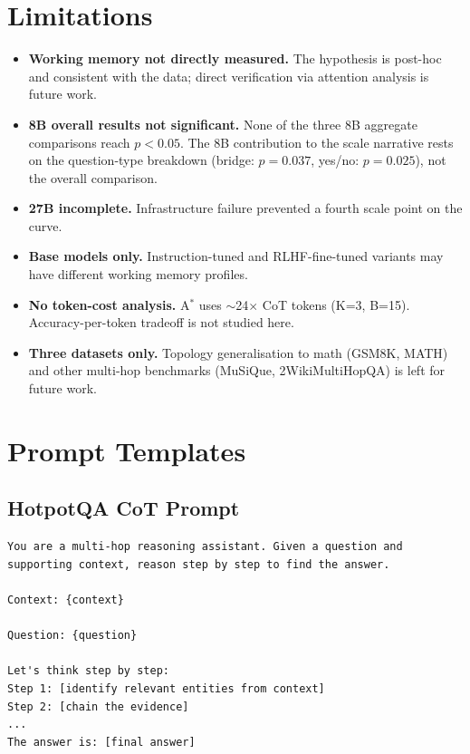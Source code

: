 \documentclass{article}
\newcommand{\astar}{A$^*$\xspace}
\begin{document}
\section*{Limitations}
\label{sec:limitations}

\begin{itemize}[leftmargin=*, noitemsep]
  \item \textbf{Working memory not directly measured.} The hypothesis is post-hoc and consistent with the data; direct verification via attention analysis is future work.
  \item \textbf{8B overall results not significant.} None of the three 8B aggregate comparisons reach $p<0.05$. The 8B contribution to the scale narrative rests on the question-type breakdown (bridge: $p=0.037$, yes/no: $p=0.025$), not the overall comparison.
  \item \textbf{27B incomplete.} Infrastructure failure prevented a fourth scale point on the curve.
  \item \textbf{Base models only.} Instruction-tuned and RLHF-fine-tuned variants may have different working memory profiles.
  \item \textbf{No token-cost analysis.} \astar uses $\sim$24$\times$ CoT tokens (K=3, B=15). Accuracy-per-token tradeoff is not studied here.
  \item \textbf{Three datasets only.} Topology generalisation to math (GSM8K, MATH) and other multi-hop benchmarks (MuSiQue, 2WikiMultiHopQA) is left for future work.
\end{itemize}




\appendix

\section{Prompt Templates}
\label{app:prompts}

\subsection{HotpotQA CoT Prompt}
\begin{verbatim}
You are a multi-hop reasoning assistant. Given a question and
supporting context, reason step by step to find the answer.

Context: {context}

Question: {question}

Let's think step by step:
Step 1: [identify relevant entities from context]
Step 2: [chain the evidence]
...
The answer is: [final answer]
\end{verbatim}
\end{document}
